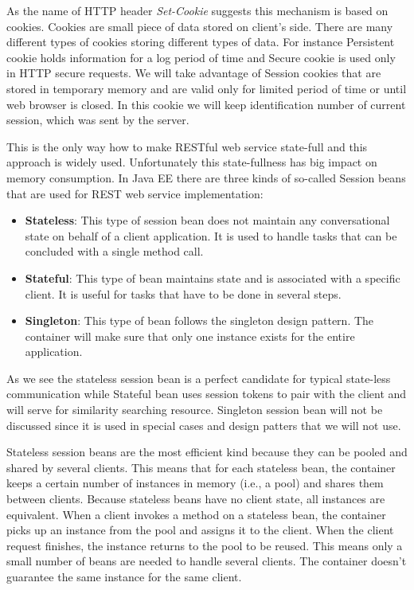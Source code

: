 \documentclass[thesis=M,english]{FITthesis}[2012/10/20]
\begin{document}
As the name of HTTP header \textit{Set-Cookie} suggests this mechanism is based on cookies. Cookies are small piece of data stored on client’s side. There are many different types of cookies storing different types of data. For instance Persistent cookie holds information for a log period of time and Secure cookie is used only in HTTP secure requests. We will take advantage of Session cookies that are stored in temporary memory and are valid only for limited period of time or until web browser is closed. In this cookie we will keep identification number of current session, which was sent by the server.

This is the only way how to make RESTful web service state-full and this approach is widely used.
Unfortunately this state-fullness has big impact on memory consumption. In Java EE there are three kinds of so-called Session beans that are used for REST web service implementation:

\begin{itemize}
\item  \textbf{Stateless}: This type of session bean does not maintain any conversational state on behalf of a client application. It is used to handle tasks that can be concluded with a single method call.
\item  \textbf{Stateful}: This type of bean maintains state and is associated with a specific client. It is useful for tasks that have to be done in several steps.
\item  \textbf{Singleton}: This type of bean follows the singleton design pattern. The container will make sure that only one instance exists for the entire application.
\end{itemize}

As we see the stateless session bean is a perfect candidate for typical state-less communication while Stateful bean uses session tokens to pair with the client and will serve for similarity searching resource. Singleton session bean will not be discussed since it is used in special cases and design patters that we will not use.

Stateless session beans are the most efficient kind because they can be pooled and shared by several clients. This means that for each stateless bean, the container keeps a certain number of instances in memory (i.e., a pool) and shares them between clients. Because stateless beans have no client state, all instances are equivalent. When a client invokes a method on a stateless bean, the container picks up an instance from the pool and assigns it to the client. When the client request finishes, the instance returns to the pool to be reused. This means only a small number of beans are needed to handle several clients. The container doesn’t guarantee the same instance for the same client.\cite{java}
\end{document}
